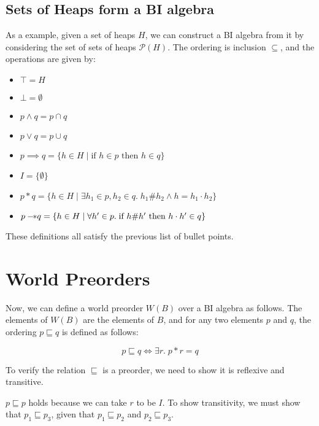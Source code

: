 \subsection{Sets of Heaps form a BI algebra}


As a example, given a set of heaps $H$, we can construct a BI algebra
from it by considering the set of sets of heaps $\mathcal{P}(H)$. The
ordering is inclusion $\subseteq$, and the operations are given by:

\begin{itemize}
\item $\top = H$
\item $\bot = \emptyset$
\item $p \land q = p \cap q$
\item $p \vee q = p \cup q$
\item $p \implies q = \{h \in H \;|\; \mbox{if } h \in p \mbox{ then } h \in q\}$
\item $I = \{\emptyset\}$
\item $p * q = \{ h \in H \;|\; \exists h_1 \in p, h_2 \in q.\; h_1 \# h_2 \land h = h_1 \cdot h_2\}$
\item $p -\!\!* q = \{ h \in H \;|\; \forall h' \in p.\; \mbox{if } h \# h' \mbox{ then } h \cdot h' \in q \}$
\end{itemize}

These definitions all satisfy the previous list of bullet points.

\section{World Preorders}

Now, we can define a world preorder $W(B)$ over a BI algebra as
follows.  The elements of $W(B)$ are the elements of $B$, and for
any two elements $p$ and $q$, the ordering $p \sqsubseteq q$ is 
defined as follows:

\begin{displaymath}
p \sqsubseteq q \iff \exists r.\; p * r = q
\end{displaymath}

To verify the relation $\sqsubseteq$ is a preorder, we need to 
show it is reflexive and transitive. 

$p \sqsubseteq p$ holds because we can take $r$ to be $I$. To show 
transitivity, we must show that $p_1 \sqsubseteq p_3$, given
that $p_1 \sqsubseteq p_2$ and $p_2 \sqsubseteq p_3$. 
\\

